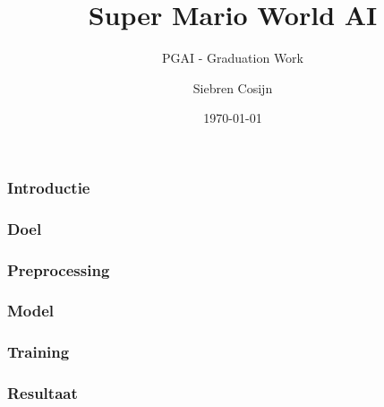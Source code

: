 \documentclass{beamer}
\title{Super Mario World AI}
\subtitle{PGAI - Graduation Work}
\author{Siebren Cosijn}
\date{\today}
\begin{document}
    \begin{frame}
        \titlepage
    \end{frame}

    \begin{frame}
        \frametitle{Introductie}
    \end{frame}

    \begin{frame}
        \frametitle{Doel}
    \end{frame}

    \begin{frame}
        \frametitle{Preprocessing}
    \end{frame}

    \begin{frame}
        \frametitle{Model}
    \end{frame}

    \begin{frame}
        \frametitle{Training}
    \end{frame}

    \begin{frame}
        \frametitle{Resultaat}
    \end{frame}
\end{document}
